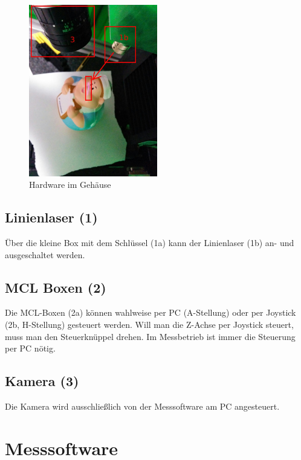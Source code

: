 \documentclass[a4paper,10pt]{scrartcl}
\begin{document}
\begin{figure}[h]
  \centering
  \includegraphics[width=0.5\textwidth]{include/IMG_20160412_135830.jpg}
  \caption{Hardware im Gehäuse}
  \label{fig:overview}
\end{figure}

\subsection{Linienlaser (1)}

Über die kleine Box mit dem Schlüssel (1a) kann der Linienlaser (1b) an- und ausgeschaltet werden.

\subsection{MCL Boxen (2)}

Die MCL-Boxen (2a) können wahlweise per PC (A-Stellung) oder per Joystick (2b, H-Stellung) gesteuert
werden. Will man die Z-Achse per Joystick steuert, muss man den Steuerknüppel drehen. Im Messbetrieb
ist immer die Steuerung per PC nötig.

\subsection{Kamera (3)}

Die Kamera wird ausschließlich von der Messsoftware am PC angesteuert.

\newpage

\section{Messsoftware}
\end{document}
